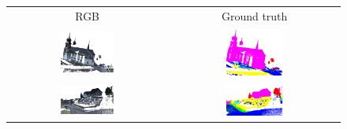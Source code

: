 \begin{figure}
    \centering
    \begin{tabular}{cc}
        RGB & Ground truth \\
        \includegraphics[width=0.35\textwidth, height=0.15\textheight]{images/sem3d_data/1.pdf} &
        \includegraphics[width=0.35\textwidth, height=0.15\textheight]{images/sem3d_data/1_gt.pdf}\\
        
        \includegraphics[width=0.35\textwidth, height=0.15\textheight]{images/sem3d_data/2.pdf} & 
        \includegraphics[width=0.35\textwidth, height=0.15\textheight]{images/sem3d_data/2_gt.pdf}\\
        

\end{tabular}
\end{figure}
